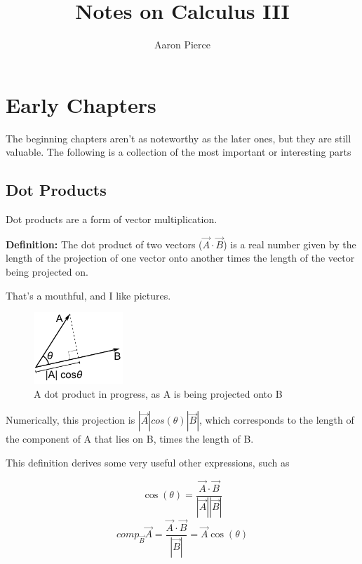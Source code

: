 \documentclass[12pt, letterpaper]{article}
\title{Notes on Calculus III}
\author{Aaron Pierce}
\date{} %
\begin{document}
\maketitle

\tableofcontents

\newpage

\section{Early Chapters}

The beginning chapters aren't as noteworthy as the later ones, but they are still valuable. The following is a collection of the most important or interesting parts

\subsection{Dot Products}
Dot products are a form of vector multiplication. 

\textbf{Definition:} The dot product of two vectors ($\vec{A} \cdot \vec{B}$) is a real number given by the length of the projection of one vector onto another times the length of the vector being projected on.

That's a mouthful, and I like pictures.

\begin{figure}[h]
    \centering 
    \includegraphics[width=0.30\textwidth]{dotproduct}
    \caption{A dot product in progress, as A is being projected onto B}
\end{figure}

Numerically, this projection is $|\vec{A}| cos(\theta) |\vec{B}|$, which corresponds to the length of the component of A that lies on B, times the length of B.

This definition derives some very useful other expressions, such as 

\begin{equation}
    \cos(\theta) = \frac{\vec{A} \cdot \vec{B}}{|\vec{A}||\vec{B}|}
\end{equation}
\begin{equation}
    comp_{\vec{B}} \vec{A} = \frac{\vec{A} \cdot \vec{B}}{|\vec{B}|} = \vec{A}\cos(\theta)
\end{equation}
\end{document}
